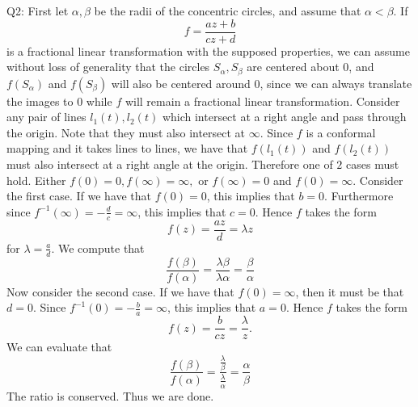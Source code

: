 \documentclass[letterpaper]{article}
\begin{document}
\noindent
Q2: First let $\alpha,\beta$ be the radii of the concentric circles, and assume that $\alpha<\beta$. If $$f = \frac{az+ b}{cz+d}$$ is a fractional linear transformation with the supposed properties, we can assume without loss of generality that the circles $S_{\alpha}, S_{\beta}$ are centered about 0, and $f(S_\alpha)$ and $f(S_\beta)$ will also be centered around 0, since we can always translate the images to 0 while $f$ will remain a fractional linear transformation.
Consider any pair of lines $l_1(t), l_2(t) $ which intersect at a right angle and pass through the origin. 
Note that they must also intersect at $\infty$. Since $f$ is a conformal mapping and it takes lines to lines, we have that $f(l_1(t))$ and $f(l_2(t))$ must also intersect at a right angle at the origin. 
Therefore one of $2$ cases must hold. Either $f(0) =0, f(\infty) = \infty , $ or $f(\infty) = 0$ and $f(0) = \infty$. Consider the first case. If we have that $f(0)=0$, this implies that $b=0$. Furthermore since $f^{-1}(\infty) = - \frac{d}{c} = \infty$, this implies that $c = 0$. Hence $f$ takes the form $$f(z) = \frac{az}{d} = \lambda z$$ for $\lambda = \frac{a}{d}$. We compute that $$\frac{f(\beta)}{f(\alpha)} = \frac{\lambda \beta}{\lambda \alpha} = \frac{\beta}{\alpha}$$
Now consider the second case. If we have that $f(0) = \infty$, then it must be that $d = 0$. Since $f^{-1}(0) = -\frac{b}{a} = \infty$, this implies that $a =0$. Hence $f$ takes the form $$f(z) = \frac{b}{cz} = \frac{\lambda}{z}. $$
We can evaluate that $$\frac{f(\beta)}{f(\alpha)} = \frac{\frac{\lambda}{\beta}}{\frac{\lambda}{\alpha}} = \frac{\alpha}{\beta}$$
The ratio is conserved. Thus we are done. 
\end{document}
